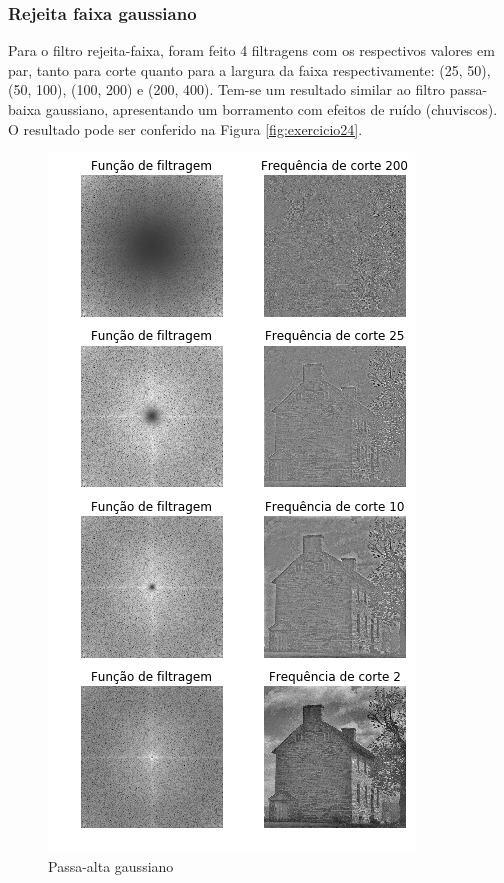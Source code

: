 \documentclass{article}
\begin{document}
\subsubsection{Rejeita faixa gaussiano}

Para o filtro rejeita-faixa, foram feito 4 filtragens com os respectivos valores em par, tanto para corte quanto para a largura da faixa respectivamente: (25, 50), (50, 100), (100, 200) e (200, 400). 
Tem-se um resultado similar ao filtro passa-baixa gaussiano, apresentando um borramento com efeitos de ruído (chuviscos). O resultado pode ser conferido na Figura \ref{fig:exercicio24}.

\begin{figure}[h!]
    \includegraphics[width=\linewidth]{results/exercicio2passa_alta.png}
    \caption{Passa-alta gaussiano}
    \label{fig:exercicio21}
\end{figure}
\end{document}
